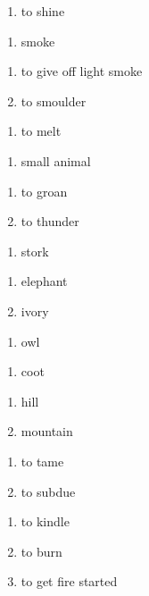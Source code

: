\begin{enumerate}
\item to shine
\end{enumerate}
\begin{enumerate}
\item smoke
\end{enumerate}
\begin{enumerate}
\item to give off light smoke
\item to smoulder
\end{enumerate}
\begin{enumerate}
\item to melt
\end{enumerate}
\begin{enumerate}
\item small animal
\end{enumerate}
\begin{enumerate}
\item to groan
\item to thunder
\end{enumerate}
\begin{enumerate}
\item stork
\end{enumerate}
\begin{enumerate}
\item elephant
\item ivory
\end{enumerate}
\begin{enumerate}
\item owl
\end{enumerate}
\begin{enumerate}
\item coot
\end{enumerate}
\begin{enumerate}
\item hill
\item mountain
\end{enumerate}
\begin{enumerate}
\item to tame
\item to subdue
\end{enumerate}
\begin{enumerate}
\item to kindle
\item to burn
\item to get fire started
\end{enumerate}
